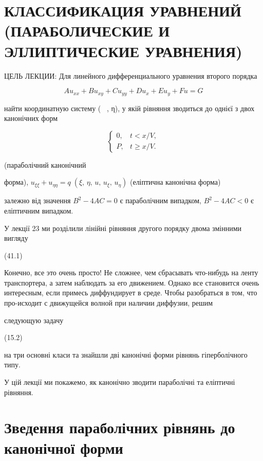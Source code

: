 \documentclass[
  ukrainian,
]{article}
\begin{document}
\section{\texorpdfstring{КЛАССИФИКАЦИЯ УРАВНЕНИЙ (ПАРАБОЛИЧЕСКИЕ И
ЭЛЛИПТИЧЕСКИЕ
\textbf{УРАВНЕНИЯ})}{КЛАССИФИКАЦИЯ УРАВНЕНИЙ (ПАРАБОЛИЧЕСКИЕ И ЭЛЛИПТИЧЕСКИЕ УРАВНЕНИЯ)}}\label{ux43aux43bux430ux441ux441ux438ux444ux438ux43aux430ux446ux438ux44f-ux443ux440ux430ux432ux43dux435ux43dux438ux439-ux43fux430ux440ux430ux431ux43eux43bux438ux447ux435ux441ux43aux438ux435-ux438-ux44dux43bux43bux438ux43fux442ux438ux447ux435ux441ux43aux438ux435-ux443ux440ux430ux432ux43dux435ux43dux438ux44f}

ЦЕЛЬ ЛЕКЦИИ: Для линейного дифференциального уравнения второго порядка

\[
Au_{xx} + Bu_{xy} + Cu_{yy} + Du_x + Eu_y + Fu = G
\]

найти координатную систему (~ , η), у якій рівняння зводиться до однієї
з двох канонічних форм

\[
\begin{cases} 0, & t < x/V, \\ P, & t \ge x/V. \end{cases}
\]

(параболічний канонічний

форма),
\(u_{\xi\xi} + u_{\eta\eta} = q \; (\xi, \, \eta, \, u, \, u_{\xi}, \, u_{\eta})\)
(еліптична канонічна форма)

залежно від значення \(B^{2} - 4AC = 0\) є параболічним випадком,
\(B^2 - 4AC < 0\) є еліптичним випадком.

У лекції 23 ми розділили лінійні рівняння другого порядку двома змінними
вигляду

(41.1)

Конечно, все это очень просто! Не сложнее, чем сбрасывать что-нибудь на
ленту транспортера, а затем наблюдать за его движением. Однако все
становится очень интересным, если примесь диффундирует в среде. Чтобы
разобраться в том, что про-исходит с движущейся волной при наличии
диффузии, решим

следующую задачу

(15.2)

на три основні класи та знайшли дві канонічні форми рівнянь
гіперболічного типу.

У цій лекції ми покажемо, як канонічно зводити параболічні та еліптичні
рівняння.

\section{Зведення параболічних рівнянь до канонічної
форми}\label{ux437ux432ux435ux434ux435ux43dux43dux44f-ux43fux430ux440ux430ux431ux43eux43bux456ux447ux43dux438ux445-ux440ux456ux432ux43dux44fux43dux44c-ux434ux43e-ux43aux430ux43dux43eux43dux456ux447ux43dux43eux457-ux444ux43eux440ux43cux438}
\end{document}
